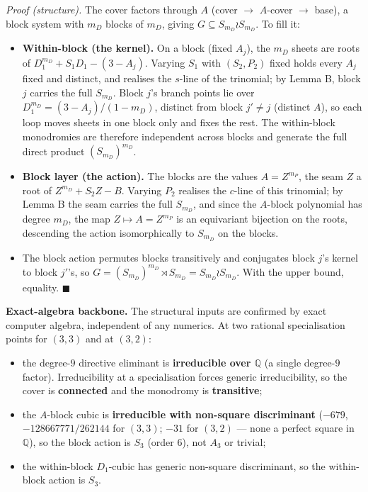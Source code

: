 \documentclass[11pt]{article}
\providecommand{\tightlist}{\setlength{\itemsep}{0pt}\setlength{\parskip}{0pt}}
\theoremstyle{plain}
\theoremstyle{definition}
\theoremstyle{remark}
\begin{document}
\emph{Proof (structure).} The cover factors through \(A\) (cover \(\to\) \(A\)-cover \(\to\) base), a block system with \(m_D\) blocks of \(m_D\), giving \(G \subseteq S_{m_D}\wr S_{m_D}\). To fill it:

\begin{itemize}
\tightlist
\item
  \textbf{Within-block (the kernel).} On a block (fixed \(A_j\)), the \(m_D\) sheets are roots of \(D_1^{m_D} + S_1 D_1 - (3-A_j)\). Varying \(S_1\) with \((S_2,P_2)\) fixed holds every \(A_j\) fixed and distinct, and realises the \(s\)-line of the trinomial; by Lemma B, block \(j\) carries the full \(S_{m_D}\). Block \(j\)'s branch points lie over \(D_1^{m_D} = (3-A_j)/(1-m_D)\), distinct from block \(j'\neq j\) (distinct \(A\)), so each loop moves sheets in one block only and fixes the rest. The within-block monodromies are therefore independent across blocks and generate the full direct product \((S_{m_D})^{m_D}\).
\item
  \textbf{Block layer (the action).} The blocks are the values \(A = Z^{m_P}\), the seam \(Z\) a root of \(Z^{m_D} + S_2 Z - B\). Varying \(P_2\) realises the \(c\)-line of this trinomial; by Lemma B the seam carries the full \(S_{m_D}\), and since the \(A\)-block polynomial has degree \(m_D\), the map \(Z\mapsto A = Z^{m_P}\) is an equivariant bijection on the roots, descending the action isomorphically to \(S_{m_D}\) on the blocks.
\item
  The block action permutes blocks transitively and conjugates block \(j\)'s kernel to block \(j'\)'s, so \(G = (S_{m_D})^{m_D}\rtimes S_{m_D} = S_{m_D}\wr S_{m_D}\). With the upper bound, equality. \(\blacksquare\)
\end{itemize}

\textbf{Exact-algebra backbone.} The structural inputs are confirmed by exact computer algebra, independent of any numerics. At two rational specialisation points for \((3,3)\) and at \((3,2)\):

\begin{itemize}
\tightlist
\item
  the degree-\(9\) directive eliminant is \textbf{irreducible over \(\mathbb Q\)} (a single degree-\(9\) factor). Irreducibility at a specialisation forces generic irreducibility, so the cover is \textbf{connected} and the monodromy is \textbf{transitive};
\item
  the \(A\)-block cubic is \textbf{irreducible with non-square discriminant} (\(-679\), \(-128667771/262144\) for \((3,3)\); \(-31\) for \((3,2)\) --- none a perfect square in \(\mathbb Q\)), so the block action is \(S_3\) (order \(6\)), not \(A_3\) or trivial;
\item
  the within-block \(D_1\)-cubic has generic non-square discriminant, so the within-block action is \(S_3\).
\end{itemize}
\end{document}
